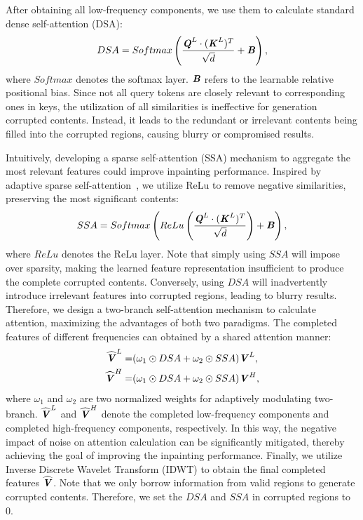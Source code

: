 After obtaining all low-frequency components, we use them to calculate standard dense self-attention (DSA):
\begin{equation}
DSA=Softmax\left(\frac{\textbf{\emph{Q}}^L\cdot{(\textbf{\emph{K}}^L)^T}}{\sqrt{d}}+\textbf{\emph{B}}\right),
\label{SSS}
\end{equation}
where $Softmax$ denotes the softmax layer. $\textbf{\emph{B}}$ refers to the learnable relative positional bias. Since not all query tokens are closely relevant to corresponding ones in keys, the utilization of all similarities is ineffective for generation corrupted contents. Instead, it leads to the redundant or irrelevant contents being filled into the corrupted regions, causing blurry or compromised results. 

Intuitively, developing a sparse self-attention (SSA) mechanism to aggregate the most relevant features could improve inpainting performance. 
Inspired by adaptive sparse self-attention~\cite{zhou2024adapt}, we utilize ReLu to remove negative similarities, preserving the most significant contents:
\begin{equation}
SSA=Softmax\left(ReLu\left(\frac{\textbf{\emph{Q}}^L\cdot{(\textbf{\emph{K}}^L)^T}}{\sqrt{d}}\right)+\textbf{\emph{B}}\right),
\label{SSS}
\end{equation}
where $ReLu$ denotes the ReLu layer. 
Note that simply using $SSA$ will impose over sparsity, making the learned feature representation insufficient to produce the complete corrupted contents. 
Conversely, using $DSA$ will inadvertently introduce irrelevant features into corrupted regions, leading to blurry results.
Therefore, we design a two-branch self-attention mechanism to calculate attention, maximizing the advantages of both two paradigms. 
The completed features of different frequencies can obtained by a shared attention manner:
\begin{equation}
\begin{split}
\widehat{\textbf{\emph{V}}}^L=&(\omega_1\odot DSA+\omega_2\odot SSA)\textbf{\emph{V}}^L,\\
\widehat{\textbf{\emph{V}}}^H=&(\omega_1\odot DSA+\omega_2\odot SSA)\textbf{\emph{V}}^H,
\label{SSS}
\end{split}
\end{equation}
where $\omega_1$ and $\omega_2$ are two normalized weights for adaptively modulating two-branch. 
$\widehat{\textbf{\emph{V}}}^L$ and $\widehat{\textbf{\emph{V}}}^H$ denote the completed low-frequency components and completed high-frequency components, respectively.  
In this way, the negative impact of noise on attention calculation can be significantly mitigated, thereby achieving the goal of improving the inpainting performance.
Finally, we utilize Inverse Discrete Wavelet Transform (IDWT) to obtain the final completed features $\widehat{\textbf{\emph{V}}}$.
Note that we only borrow information from valid regions to generate corrupted contents. 
Therefore, we set the $DSA$ and $SSA$ in corrupted regions to 0.



